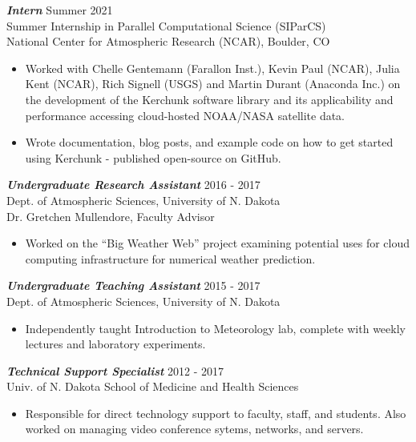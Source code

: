 \documentclass[overlapped]{res}
\begin{document}
\begin{resume}
                {\sl \textbf{Intern}} \hfill Summer 2021 \\
                Summer Internship in Parallel Computational Science (SIParCS) \\
                National Center for Atmospheric Research (NCAR), Boulder, CO \\
                \begin{itemize}
                    \item Worked with Chelle Gentemann (Farallon Inst.), Kevin Paul (NCAR), Julia Kent (NCAR), Rich Signell (USGS) and Martin Durant (Anaconda Inc.) on the development of the Kerchunk software library and its applicability and performance accessing cloud-hosted NOAA/NASA satellite data.
                    \item Wrote documentation, blog posts, and example code on how to get started using Kerchunk - published open-source on GitHub.
                \end{itemize} 
                {\sl \textbf{Undergraduate Research Assistant}} \hfill 2016 - 2017 \\
                Dept. of Atmospheric Sciences, University of N. Dakota \\
                Dr. Gretchen Mullendore, Faculty Advisor \\
                \begin{itemize}\itemsep -2pt
                    \item Worked on the “Big Weather Web” project examining potential uses for cloud computing infrastructure for numerical weather prediction.
                \end{itemize}

                {\sl \textbf{Undergraduate Teaching Assistant}} \hfill 2015 - 2017 \\
                Dept. of Atmospheric Sciences, University of N. Dakota \\
                \begin{itemize}\itemsep -2pt
                    \item Independently taught Introduction to Meteorology lab, complete with weekly lectures and laboratory experiments.
                    
                \end{itemize}

                {\sl \textbf{Technical Support Specialist}} \hfill 2012 - 2017 \\
                Univ. of N. Dakota School of Medicine and Health Sciences \\
                \begin{itemize} \itemsep -2pt
                    \item Responsible  for  direct  technology  support  to  faculty,  staff,  and  students.  Also  worked  on managing video conference sytems, networks, and servers.


\end{itemize}
\end{resume}
\end{document}
